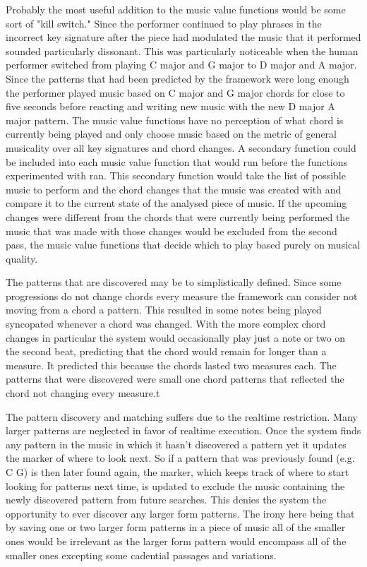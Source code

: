 \documentclass[12pt]{ucthesis}
\begin{document}
{Probably the most useful addition to the music value functions would be some sort of "kill switch." Since the performer continued to play phrases in the incorrect key signature after the piece had modulated the music that it performed sounded particularly dissonant. This was particularly noticeable when the human performer switched from playing C major and G major to D major and A major. Since the patterns that had been predicted by the framework were long enough the performer played music based on C major and G major chords for close to five seconds before reacting and writing new music with the new D major A major pattern. The music value functions have no perception of what chord is currently being played and only choose music based on the metric of general musicality over all key signatures and chord changes. A secondary function could be included into each music value function that would run before the functions experimented with ran. This secondary function would take the list of possible music to perform and the chord changes that the music was created with and compare it to the current state of the analysed piece of music. If the upcoming changes were different from the chords that were currently being performed the music that was made with those changes would be excluded from the second pass, the music value functions that decide which to play based purely on musical quality. 

The patterns that are discovered may be to simplistically defined. Since some progressions do not change chords every measure the framework can consider not moving from a chord a pattern. This resulted in some notes being played syncopated whenever a chord was changed. With the more complex chord changes in particular the system would occasionally play just a note or two on the second beat, predicting that the chord would remain for longer than a measure. It predicted this because the chords lasted two measures each. The patterns that were discovered were small one chord patterns that reflected the chord not changing every measure.t

The pattern discovery and matching suffers due to the realtime restriction. Many larger patterns are neglected in favor of realtime execution. Once the system finds any pattern in the music in which it hasn't discovered a pattern yet it updates the marker of where to look next. So if a pattern that was previously found (e.g. C G) is then later found again, the marker, which keeps track of where to start looking for patterns next time, is updated to exclude the music containing the newly discovered pattern from future searches. This denies the system the opportunity to ever discover any larger form patterns. The irony here being that by saving one or two larger form patterns in a piece of music all of the smaller ones would be irrelevant as the larger form pattern would encompass all of the smaller ones excepting some cadential passages and variations. 

}
\end{document}
